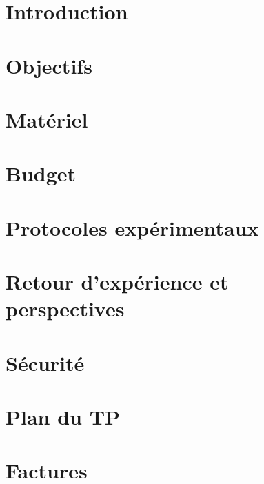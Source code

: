 \documentclass{article}
\begin{document}


\tableofcontents

\newpage

\section{{Introduction}}


\section{{Objectifs}}


\section{{Matériel}}


\section{{Budget}}


\section{{Protocoles expérimentaux}}


\section{{Retour d'expérience et perspectives}}


\newpage

\appendix

\section{{Sécurité}}


\section{Plan du TP}


\section{Factures}


\newpage



\end{document}
